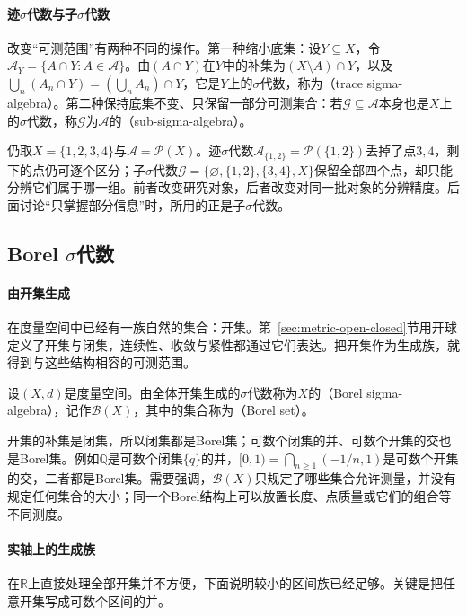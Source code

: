 \paragraph{迹$\sigma$代数与子$\sigma$代数}
改变“可测范围”有两种不同的操作。第一种缩小底集：设$Y\subseteq X$，令$\mathcal A_Y=\{A\cap Y:A\in\mathcal A\}$。由$(A\cap Y)$在$Y$中的补集为$(X\setminus A)\cap Y$，以及$\bigcup_n(A_n\cap Y)=(\bigcup_nA_n)\cap Y$，它是$Y$上的$\sigma$代数，称为（trace sigma-algebra）。第二种保持底集不变、只保留一部分可测集合：若$\mathcal G\subseteq\mathcal A$本身也是$X$上的$\sigma$代数，称$\mathcal G$为$\mathcal A$的（sub-sigma-algebra）。

仍取$X=\{1,2,3,4\}$与$\mathcal A=\mathcal P(X)$。迹$\sigma$代数$\mathcal A_{\{1,2\}}=\mathcal P(\{1,2\})$丢掉了点$3,4$，剩下的点仍可逐个区分；子$\sigma$代数$\mathcal G=\{\varnothing,\{1,2\},\{3,4\},X\}$保留全部四个点，却只能分辨它们属于哪一组。前者改变研究对象，后者改变对同一批对象的分辨精度。后面讨论“只掌握部分信息”时，所用的正是子$\sigma$代数。

\subsection{Borel $\sigma$代数}
\label{sec:measure-borel-sets}

\paragraph{由开集生成}
在度量空间中已经有一族自然的集合：开集。第~\ref{sec:metric-open-closed}节用开球定义了开集与闭集，连续性、收敛与紧性都通过它们表达。把开集作为生成族，就得到与这些结构相容的可测范围。

\begin{definition}
\label{def:measure-borel}
设$(X,d)$是度量空间。由全体开集生成的$\sigma$代数称为$X$的（Borel sigma-algebra），记作$\mathcal B(X)$，其中的集合称为（Borel set）。
\end{definition}

开集的补集是闭集，所以闭集都是Borel集；可数个闭集的并、可数个开集的交也是Borel集。例如$\mathbb Q$是可数个闭集$\{q\}$的并，$[0,1)=\bigcap_{n\ge1}(-1/n,1)$是可数个开集的交，二者都是Borel集。需要强调，$\mathcal B(X)$只规定了哪些集合允许测量，并没有规定任何集合的大小；同一个Borel结构上可以放置长度、点质量或它们的组合等不同测度。

\paragraph{实轴上的生成族}
在$\mathbb R$上直接处理全部开集并不方便，下面说明较小的区间族已经足够。关键是把任意开集写成可数个区间的并。


